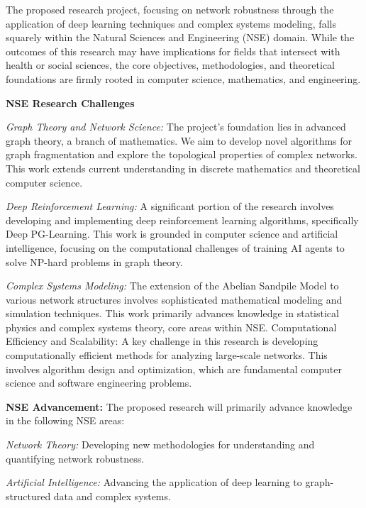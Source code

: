 \begin{justification-for-eligibility-of-proposed-research}
\vspace{-1.0em}
The proposed research project, focusing on network robustness through the application of deep learning techniques and complex systems modeling, falls squarely within the Natural Sciences and Engineering (NSE) domain. While the outcomes of this research may have implications for fields that intersect with health or social sciences, the core objectives, methodologies, and theoretical foundations are firmly rooted in computer science, mathematics, and engineering.

\textbf{NSE Research Challenges}

\vspace{-1.0em}
\textit{Graph Theory and Network Science:} The project's foundation lies in advanced graph theory, a branch of mathematics. We aim to develop novel algorithms for graph fragmentation and explore the topological properties of complex networks. This work extends current understanding in discrete mathematics and theoretical computer science.

\textit{Deep Reinforcement Learning:} A significant portion of the research involves developing and implementing deep reinforcement learning algorithms, specifically Deep PG-Learning. This work is grounded in computer science and artificial intelligence, focusing on the computational challenges of training AI agents to solve NP-hard problems in graph theory.

\textit{Complex Systems Modeling:} The extension of the Abelian Sandpile Model to various network structures involves sophisticated mathematical modeling and simulation techniques. This work primarily advances knowledge in statistical physics and complex systems theory, core areas within NSE.
Computational Efficiency and Scalability:
A key challenge in this research is developing computationally efficient methods for analyzing large-scale networks. This involves algorithm design and optimization, which are fundamental computer science and software engineering problems.

\textbf{NSE Advancement:} The proposed research will primarily advance knowledge in the following NSE areas:

\textit{Network Theory:} Developing new methodologies for understanding and quantifying network robustness.

\textit{Artificial Intelligence:} Advancing the application of deep learning to graph-structured data and complex systems.


\end{justification-for-eligibility-of-proposed-research}
